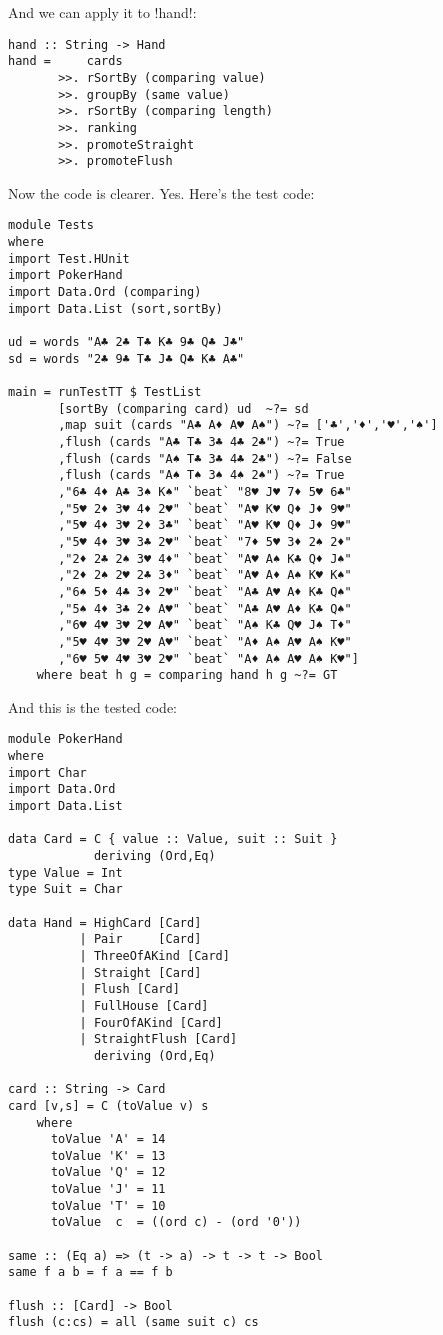 \lhA \success And we can apply it to \il!hand!:
\begin{lstlisting}[frame=single]
hand :: String -> Hand
hand =     cards
       >>. rSortBy (comparing value)
       >>. groupBy (same value)
       >>. rSortBy (comparing length)
       >>. ranking 
       >>. promoteStraight
       >>. promoteFlush    
\end{lstlisting}
\success Now the code is clearer.
\lhN Yes. Here's the test code:
\begin{lstlisting}[frame=single]
module Tests
where 
import Test.HUnit
import PokerHand
import Data.Ord (comparing)
import Data.List (sort,sortBy)

ud = words "A♣ 2♣ T♣ K♣ 9♣ Q♣ J♣"
sd = words "2♣ 9♣ T♣ J♣ Q♣ K♣ A♣"

main = runTestTT $ TestList 
       [sortBy (comparing card) ud  ~?= sd
       ,map suit (cards "A♣ A♦ A♥ A♠") ~?= ['♣','♦','♥','♠']
       ,flush (cards "A♣ T♣ 3♣ 4♣ 2♣") ~?= True
       ,flush (cards "A♠ T♣ 3♣ 4♣ 2♣") ~?= False
       ,flush (cards "A♠ T♠ 3♠ 4♠ 2♠") ~?= True
       ,"6♣ 4♦ A♣ 3♠ K♠" `beat` "8♥ J♥ 7♦ 5♥ 6♣"
       ,"5♥ 2♦ 3♥ 4♦ 2♥" `beat` "A♥ K♥ Q♦ J♦ 9♥"
       ,"5♥ 4♦ 3♥ 2♦ 3♣" `beat` "A♥ K♥ Q♦ J♦ 9♥"
       ,"5♥ 4♦ 3♥ 3♣ 2♥" `beat` "7♦ 5♥ 3♦ 2♠ 2♦"
       ,"2♦ 2♣ 2♠ 3♥ 4♦" `beat` "A♥ A♠ K♣ Q♦ J♠"
       ,"2♦ 2♠ 2♥ 2♣ 3♦" `beat` "A♥ A♦ A♠ K♥ K♠"
       ,"6♠ 5♦ 4♣ 3♦ 2♥" `beat` "A♣ A♥ A♦ K♣ Q♠"
       ,"5♠ 4♦ 3♣ 2♦ A♥" `beat` "A♣ A♥ A♦ K♣ Q♠"
       ,"6♥ 4♥ 3♥ 2♥ A♥" `beat` "A♠ K♣ Q♥ J♠ T♦"
       ,"5♥ 4♥ 3♥ 2♥ A♥" `beat` "A♦ A♠ A♥ A♠ K♥"
       ,"6♥ 5♥ 4♥ 3♥ 2♥" `beat` "A♦ A♠ A♥ A♠ K♥"]
    where beat h g = comparing hand h g ~?= GT
\end{lstlisting} %
\hspace*{\fill}
\lhA And this is the tested code:
\begin{lstlisting}[frame=single]
module PokerHand
where
import Char
import Data.Ord
import Data.List

data Card = C { value :: Value, suit :: Suit } 
            deriving (Ord,Eq)
type Value = Int
type Suit = Char

data Hand = HighCard [Card]
          | Pair     [Card]
          | ThreeOfAKind [Card]
          | Straight [Card]
          | Flush [Card]
          | FullHouse [Card]
          | FourOfAKind [Card]
          | StraightFlush [Card]
            deriving (Ord,Eq)

card :: String -> Card
card [v,s] = C (toValue v) s
    where 
      toValue 'A' = 14
      toValue 'K' = 13
      toValue 'Q' = 12
      toValue 'J' = 11
      toValue 'T' = 10
      toValue  c  = ((ord c) - (ord '0'))

same :: (Eq a) => (t -> a) -> t -> t -> Bool
same f a b = f a == f b

flush :: [Card] -> Bool
flush (c:cs) = all (same suit c) cs
\end{lstlisting}
